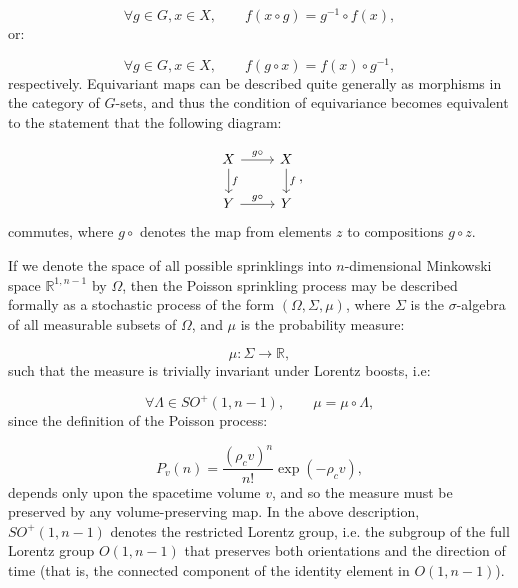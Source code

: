 \documentclass{article}
\begin{document}
\begin{equation}
\forall g \in G, x \in X, \qquad f \left( x \circ g \right) = g^{-1} \circ f \left( x \right),
\end{equation}
or:

\begin{equation}
\forall g \in G, x \in X, \qquad f \left( g \circ x \right) = f \left( x \right) \circ g^{-1},
\end{equation}
respectively. Equivariant maps can be described quite generally as morphisms in the category of $G$-sets, and thus the condition of equivariance becomes equivalent to the statement that the following diagram:

\begin{equation}
\begin{tikzcd}
X \arrow[r, "g \circ"] \arrow[d, "f"] & X \arrow[d, "f"]\\
Y \arrow[r, "g \circ"] & Y
\end{tikzcd},
\end{equation}
commutes, where ${g \circ}$ denotes the map from elements $z$ to compositions ${g \circ z}$.

If we denote the space of all possible sprinklings into $n$-dimensional Minkowski space ${\mathbb{R}^{1, n - 1}}$ by ${\Omega}$, then the Poisson sprinkling process may be described formally as a stochastic process of the form ${\left( \Omega, \Sigma, \mu \right)}$, where ${\Sigma}$ is the ${\sigma}$-algebra of all measurable subsets of ${\Omega}$, and ${\mu}$ is the probability measure:

\begin{equation}
\mu : \Sigma \to \mathbb{R},
\end{equation}
such that the measure is trivially invariant under Lorentz boosts, i.e:

\begin{equation}
\forall \Lambda \in SO^{+} \left( 1, n -1 \right), \qquad \mu = \mu \circ \Lambda,
\end{equation}
since the definition of the Poisson process:

\begin{equation}
P_v \left( n \right) = \frac{\left( \rho_c v \right)^n}{n!} \exp \left( - \rho_c v \right),
\end{equation}
depends only upon the spacetime volume $v$\cite{chiu}, and so the measure must be preserved by any volume-preserving map. In the above description, ${SO^{+} \left( 1, n - 1 \right)}$ denotes the restricted Lorentz group, i.e. the subgroup of the full Lorentz group ${O \left( 1, n - 1 \right)}$ that preserves both orientations and the direction of time (that is, the connected component of the identity element in ${O \left( 1, n - 1 \right)}$).
\end{document}
